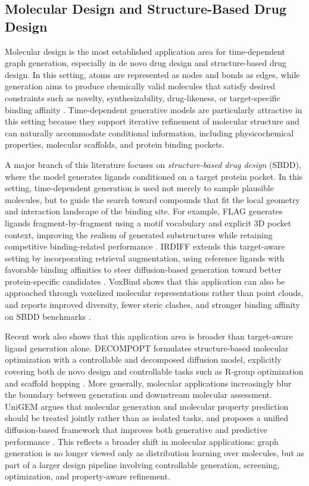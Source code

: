 \documentclass{article}
\begin{document}
\subsection{Molecular Design and Structure-Based Drug Design}
\label{sec:app_molecular}

Molecular design is the most established application area for time-dependent graph generation, especially in de novo drug design and structure-based drug design. In this setting, atoms are represented as nodes and bonds as edges, while generation aims to produce chemically valid molecules that satisfy desired constraints such as novelty, synthesizability, drug-likeness, or target-specific binding affinity \cite{alakhdar2024diffusion}. Time-dependent generative models are particularly attractive in this setting because they support iterative refinement of molecular structure and can naturally accommodate conditional information, including physicochemical properties, molecular scaffolds, and protein binding pockets.

A major branch of this literature focuses on \emph{structure-based drug design} (SBDD), where the model generates ligands conditioned on a target protein pocket. In this setting, time-dependent generation is used not merely to sample plausible molecules, but to guide the search toward compounds that fit the local geometry and interaction landscape of the binding site. For example, FLAG generates ligands fragment-by-fragment using a motif vocabulary and explicit 3D pocket context, improving the realism of generated substructures while retaining competitive binding-related performance \cite{zhang2023flag}. IRDIFF extends this target-aware setting by incorporating retrieval augmentation, using reference ligands with favorable binding affinities to steer diffusion-based generation toward better protein-specific candidates \cite{huang2024irdiff}. VoxBind shows that this application can also be approached through voxelized molecular representations rather than point clouds, and reports improved diversity, fewer steric clashes, and stronger binding affinity on SBDD benchmarks \cite{pinheiro2024voxbind}.

Recent work also shows that this application area is broader than target-aware ligand generation alone. DECOMPOPT formulates structure-based molecular optimization with a controllable and decomposed diffusion model, explicitly covering both de novo design and controllable tasks such as R-group optimization and scaffold hopping \cite{zhou2024decompopt}. More generally, molecular applications increasingly blur the boundary between generation and downstream molecular assessment. UniGEM argues that molecular generation and molecular property prediction should be treated jointly rather than as isolated tasks, and proposes a unified diffusion-based framework that improves both generative and predictive performance \cite{feng2025unigem}. This reflects a broader shift in molecular applications: graph generation is no longer viewed only as distribution learning over molecules, but as part of a larger design pipeline involving controllable generation, screening, optimization, and property-aware refinement.
\end{document}
